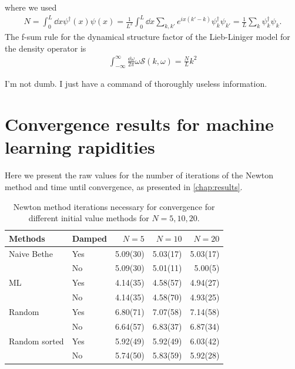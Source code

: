 \documentclass[11pt, a4paper]{report} %
\begin{document}
where we used 
\begin{align}
  \label{eq:6}
  N = \int_0^{L} \dd x \psi^{\dagger}(x) \psi(x)
    = \frac{1}{L^2} \int_{0}^L \dd x \sum_{k,k'} e^{ix(k'-k)} \psi_k^{\dag} \psi_{k'}
    = \frac{1}{L} \sum_k \psi^{\dag}_k \psi_k .
\end{align}
The f-sum rule for the dynamical structure factor of the Lieb-Liniger model for the density operator is
\begin{align}
  \label{eq:16}
  \int_{-\infty}^{\infty} \frac{\dd \omega}{2\pi} \omega \mathcal{S}(k, \omega) = \frac{N}{L}k^2
\end{align}

\begin{savequote}[50mm]
I'm not dumb. I just have a command of thoroughly useless information.
\end{savequote}

\chapter{Convergence results for machine learning rapidities}\label{cha:rawvalues}

Here we present the raw values for the number of iterations of the Newton method and time until convergence, as presented in \cref{chap:results}.


\begin{table}[h]
  \centering
  \begin{tabular}{llrrr}
    Methods & Damped & \(N=5\) & \(N=10\) & \(N=20\) \\\midrule 
    Naive Bethe & Yes & 5.09(30) & 5.03(17) & 5.03(17) \\ 
           & No & 5.09(30) & 5.01(11) & 5.00(5) \\\midrule
    ML & Yes & 4.14(35) & 4.58(57) & 4.94(27) \\
           & No & 4.14(35) & 4.58(70) & 4.93(25) \\\midrule
    Random & Yes & 6.80(71) & 7.07(58) & 7.14(58) \\
           & No & 6.64(57) & 6.83(37) & 6.87(34) \\\midrule
    Random sorted  & Yes & 5.92(49) & 5.92(49) & 6.03(42)  \\
           & No & 5.74(50) & 5.83(59) & 5.92(28)
  \end{tabular}
  \caption{Newton method iterations necessary for convergence for different initial value methods for \(N=5,10,20\).}
\end{table}
\end{document}
